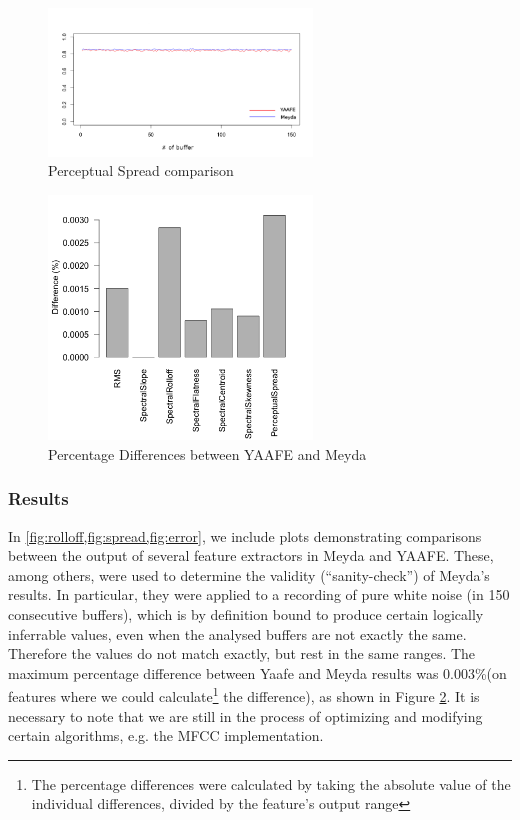 \documentclass{sig-alternate}
\begin{document}
\begin{figure}[ht!]
\centering
\includegraphics[width=70mm]{PSP.png}
\caption{Perceptual Spread comparison}
\label{fig:spread}
\end{figure}

\begin{figure}[ht!]
\centering
\includegraphics[width=70mm]{YAAFEvsMeyda.png}
\caption{Percentage Differences between YAAFE and Meyda}
\label{fig:error}
\end{figure}

\subsubsection{Results}
In \cref{fig:rolloff,fig:spread,fig:error}, we include plots demonstrating comparisons between the output of several feature extractors in Meyda and YAAFE. These, among others, were used to determine the validity (``sanity-check'') of Meyda's results. In particular, they were applied to a recording of pure white noise (in 150 consecutive buffers), which is by definition bound to produce certain logically inferrable values, even when the analysed buffers are not exactly the same. Therefore the values do not match exactly, but rest in the same ranges. The maximum percentage difference between Yaafe and Meyda results was 0.003\%(on features where we could calculate\footnote{The percentage differences were calculated by taking the absolute value of the individual differences, divided by the feature's output range} the difference), as shown in Figure \ref{fig:error}. It is necessary to note that we are still in the process of optimizing and modifying certain algorithms, e.g. the MFCC implementation.
\end{document}
